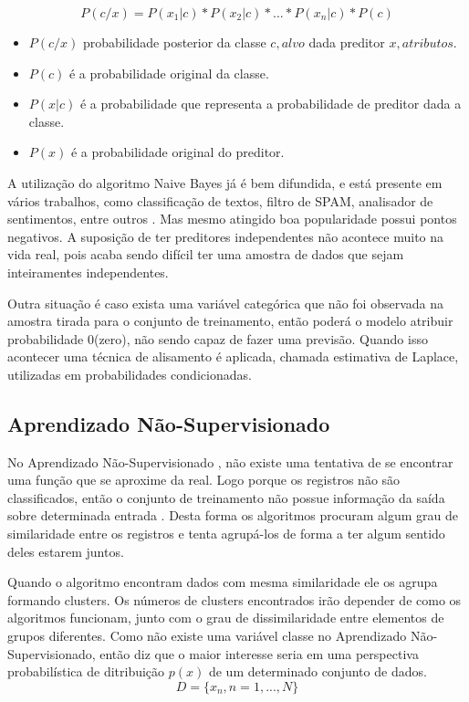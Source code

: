 \begin{equation}
 P(c/x)=P(x_1|c)*P(x_2|c)*...*P(x_n|c)*P(c)
 \label{eq:bayes}
\end{equation}


\begin{itemize}
 \item ${P(c/x)}$ probabilidade posterior da classe ${c,alvo}$ dada preditor ${x,atributos}$.
 \item ${P(c)}$  é a probabilidade original da classe.
 \item ${P(x|c)}$  é a probabilidade que representa a probabilidade de preditor dada a classe.
 \item ${P(x)}$  é a probabilidade original do preditor.
\end{itemize}

A utilização do algoritmo Naive Bayes já é bem difundida, e está presente em vários trabalhos, como classificação de textos, filtro de SPAM, analisador de sentimentos, entre outros \cite{ Madureira2017, Lucca2013, Wu2008, Mccallum1997}. Mas mesmo atingido boa popularidade possui pontos negativos. A suposição de ter preditores independentes não acontece muito na vida real, pois acaba sendo difícil ter uma amostra de dados que sejam inteiramentes independentes. 

Outra situação é caso exista uma variável categórica que não foi observada na amostra tirada para o conjunto de treinamento, então poderá o modelo atribuir probabilidade 0(zero), não sendo capaz de fazer uma previsão. Quando isso acontecer uma técnica de alisamento é aplicada, chamada estimativa de Laplace, utilizadas em probabilidades condicionadas.


\subsection{Aprendizado Não-Supervisionado}\label{ssec:aprendNSup}

No Aprendizado Não-Supervisionado , não existe uma tentativa de se encontrar uma função que se aproxime da real. Logo porque os registros não são classificados, então o conjunto de treinamento não possue informação da saída sobre determinada entrada . Desta forma os algoritmos procuram algum grau de similaridade entre os registros e tenta agrupá-los de forma a ter algum sentido deles estarem juntos. 

Quando o algoritmo encontram dados com mesma similaridade ele os agrupa formando clusters. Os números de clusters encontrados irão depender de como os algoritmos funcionam, junto com o grau de dissimilaridade entre elementos de grupos diferentes. Como não existe uma variável classe no Aprendizado Não-Supervisionado, então \cite{Barber2011} diz que o maior interesse seria em uma perspectiva probabilística de ditribuição ${p(x)}$ de um determinado conjunto de dados.
\begin{equation}
 D = \{x_{n},n=1,...,N\}
 \label{eq:aprendNSup}
\end{equation}

